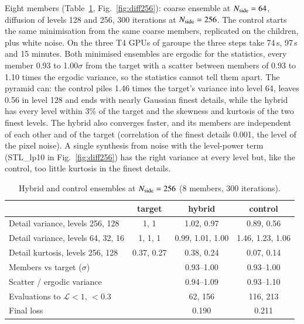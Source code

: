 \documentclass{aa}
\newcommand{\nside}{N_{\rm side}}
\begin{document}
Eight members (Table~\ref{tab:diff256}, Fig.~\ref{fig:diff256}): coarse ensemble at $\nside=64$, diffusion of levels 128 and 256, 300 iterations at $\nside=256$. The control starts the same minimisation from the same coarse members, replicated on the children, plus white noise. On the three T4 GPUs of garoupe the three steps take 74\,s, 97\,s and 15 minutes. Both minimised ensembles are ergodic for the statistics, every member 0.93 to 1.00$\sigma$ from the target with a scatter between members of 0.93 to 1.10 times the ergodic variance, so the statistics cannot tell them apart. The pyramid can: the control piles 1.46 times the target's variance into level 64, leaves 0.56 in level 128 and ends with nearly Gaussian finest details, while the hybrid has every level within 3\% of the target and the skewness and kurtosis of the two finest levels. The hybrid also converges faster, and its members are independent of each other and of the target (correlation of the finest details 0.001, the level of the pixel noise). A single synthesis from noise with the level-power term (STL\_lp10 in Fig.~\ref{fig:diff256}) has the right variance at every level but, like the control, too little kurtosis in the finest details.

\begin{table}
\caption{Hybrid and control ensembles at $\nside=256$ (8 members, 300 iterations).}
\label{tab:diff256}
\centering\small
\begin{tabular}{lccc}
\hline\hline
 & target & hybrid & control \\
\hline
Detail variance, levels 256, 128 & 1, 1 & 1.02, 0.97 & 0.89, 0.56 \\
Detail variance, levels 64, 32, 16 & 1, 1, 1 & 0.99, 1.01, 1.00 & 1.46, 1.23, 1.06 \\
Detail kurtosis, levels 256, 128 & 0.37, 0.27 & 0.38, 0.24 & 0.07, 0.14 \\
Members vs target ($\sigma$) & & 0.93--1.00 & 0.93--1.00 \\
Scatter / ergodic variance & & 0.94--1.09 & 0.93--1.10 \\
Evaluations to $\mathcal{L}<1$, $<0.3$ & & 62, 156 & 116, 213 \\
Final loss & & 0.190 & 0.211 \\
\hline
\end{tabular}
\end{table}
\end{document}
